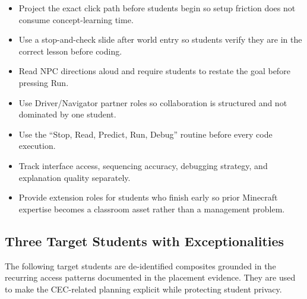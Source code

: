 \documentclass[12pt]{article}
\begin{document}
\begin{keybox}
\begin{itemize}
\item Project the exact click path before students begin so setup friction does not consume concept-learning time.
\item Use a stop-and-check slide after world entry so students verify they are in the correct lesson before coding.
\item Read NPC directions aloud and require students to restate the goal before pressing Run.
\item Use Driver/Navigator partner roles so collaboration is structured and not dominated by one student.
\item Use the ``Stop, Read, Predict, Run, Debug'' routine before every code execution.
\item Track interface access, sequencing accuracy, debugging strategy, and explanation quality separately.
\item Provide extension roles for students who finish early so prior Minecraft expertise becomes a classroom asset rather than a management problem.
\end{itemize}
\end{keybox}

\subsection{Three Target Students with Exceptionalities}
The following target students are de-identified composites grounded in the recurring access patterns documented in the placement evidence. They are used to make the CEC-related planning explicit while protecting student privacy.
\end{document}
